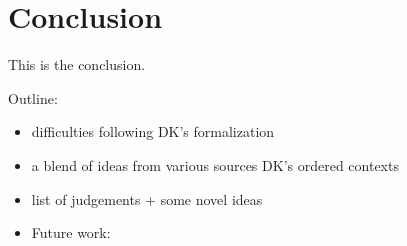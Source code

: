 \section{Conclusion}

This is the conclusion.


Outline:
\begin{itemize}
    \item difficulties following DK's formalization
    \item a blend of ideas from various sources DK's ordered contexts
    \item list of judgements + some novel ideas
    \item Future work: 
\end{itemize}


